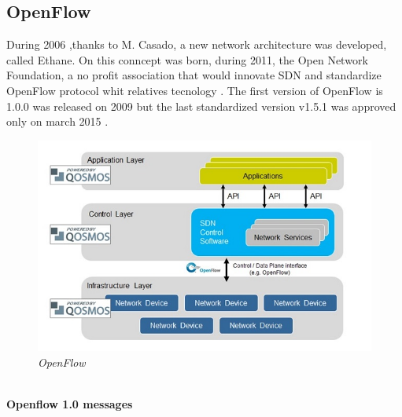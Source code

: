 \documentclass[article,10pt]{IEEEtran}
\begin{document}
\subsection{OpenFlow}
  During 2006 ,thanks to M. Casado, a new network architecture was developed, called Ethane.
  On this conncept was born, during 2011, the Open Network Foundation, a no profit association that would innovate SDN and standardize OpenFlow protocol whit relatives tecnology \cite{ONF}.
  The first version of OpenFlow is 1.0.0 was released on 2009 but the last standardized version v1.5.1 was approved only on march 2015 \cite{ONF_report}.
\begin{figure}[!h]
 \centering
 \includegraphics[scale=0.58]{images/of.jpg}
 \caption{\emph{OpenFlow}}
 \label{fig:topo}
\end{figure}
  \\
  \textbf{Openflow 1.0 messages}
  
\end{document}
